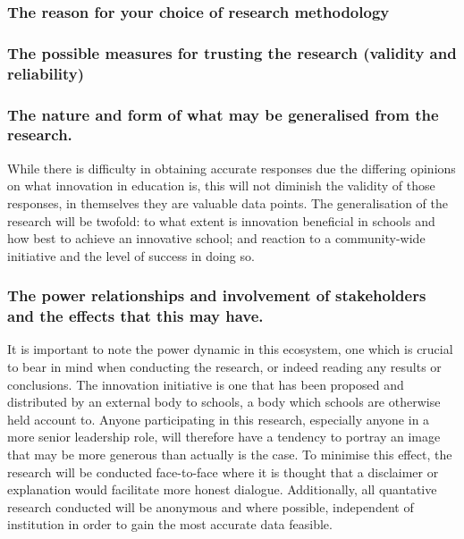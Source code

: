 \subsubsection{The reason for your choice of research methodology}



\subsubsection{The possible measures for trusting the research (validity and reliability)}
\subsubsection{The nature and form of what may be generalised from the research.}

While there is difficulty in obtaining accurate responses due the differing opinions on what innovation in education is, this will not diminish the validity of those responses, in themselves they are valuable data points. The generalisation of the research will be twofold: to what extent is innovation beneficial in schools and how best to achieve an innovative school; and reaction to a community-wide initiative and the level of success in doing so.

\subsubsection{The power relationships and involvement of stakeholders and the effects that this may have.}

It is important to note the power dynamic in this ecosystem, one which is crucial to bear in mind when conducting the research, or indeed reading any results or conclusions. The innovation initiative is one that has been proposed and distributed by an external body to schools, a body which schools are otherwise held account to. Anyone participating in this research, especially anyone in a more senior leadership role, will therefore have a tendency to portray an image that may be more generous than actually is the case. To minimise this effect, the research will be conducted face-to-face where it is thought that a disclaimer or explanation would facilitate more honest dialogue. Additionally, all quantative research conducted will be anonymous and where possible, independent of institution in order to gain the most accurate data feasible.

